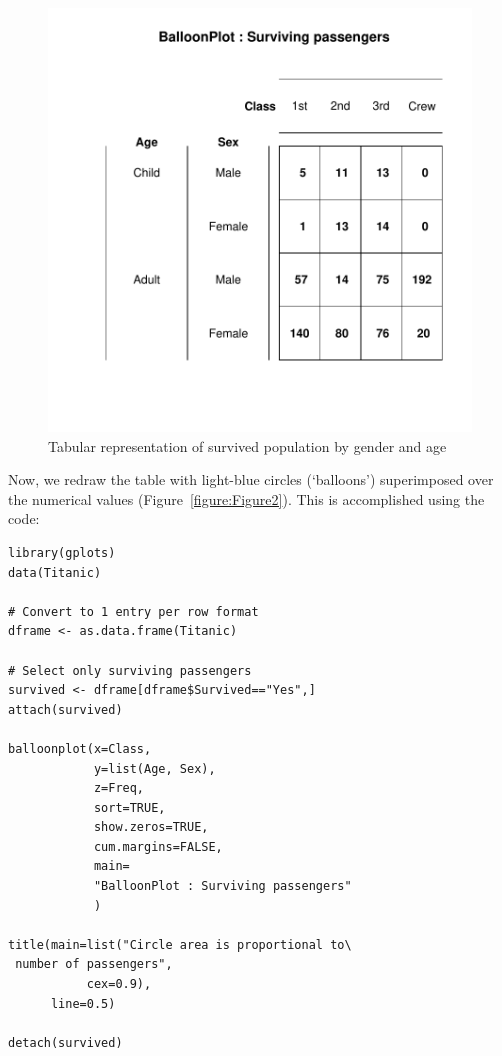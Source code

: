 \documentclass[a4paper]{report}
\begin{document}
\begin{article}
\begin{figure}
\includegraphics[width=\textwidth]{Figure1.pdf}
\caption{\label{figure:Figure1}
Tabular representation of survived population by gender and age}
\end{figure}


Now, we redraw the table with light-blue circles (`balloons')
superimposed over the numerical values (Figure~\ref{figure:Figure2}).
This is accomplished using the code:

{\small
\begin{verbatim}
library(gplots)
data(Titanic)

# Convert to 1 entry per row format
dframe <- as.data.frame(Titanic) 

# Select only surviving passengers
survived <- dframe[dframe$Survived=="Yes",]
attach(survived)

balloonplot(x=Class,
            y=list(Age, Sex),
            z=Freq,
            sort=TRUE,
            show.zeros=TRUE,
            cum.margins=FALSE,
            main=
            "BalloonPlot : Surviving passengers"
            )

title(main=list("Circle area is proportional to\
 number of passengers",
           cex=0.9),
      line=0.5)

detach(survived)
\end{verbatim}
}


\end{article}
\end{document}
